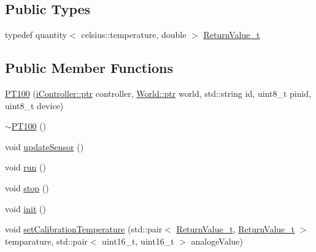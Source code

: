 \subsection*{Public Types}
\begin{DoxyCompactItemize}
\item 
typedef quantity$<$ celsius\+::temperature, double $>$ \hyperlink{classo_cpt_1_1components_1_1sensors_1_1_p_t100_a46c281d97bd4bd34e16f486a6aeda82e}{Return\+Value\+\_\+t}
\end{DoxyCompactItemize}
\subsection*{Public Member Functions}
\begin{DoxyCompactItemize}
\item 
\hyperlink{classo_cpt_1_1components_1_1sensors_1_1_p_t100_aedb71224bcffefd6d43ee72458344826}{P\+T100} (\hyperlink{classo_cpt_1_1i_controller_a6d89a95cd6ad68bb74adfaca2f36370f}{i\+Controller\+::ptr} controller, \hyperlink{classo_cpt_1_1_world_aa6e591e3096d5de71e0cec9039663d67}{World\+::ptr} world, std\+::string id, uint8\+\_\+t pinid, uint8\+\_\+t device)
\item 
\hyperlink{classo_cpt_1_1components_1_1sensors_1_1_p_t100_aa6fcce0276d47e75a16f153962c57b8c}{$\sim$\+P\+T100} ()
\item 
void \hyperlink{classo_cpt_1_1components_1_1sensors_1_1_p_t100_a66619675288a5344a55242d9bf097aee}{update\+Sensor} ()
\item 
void \hyperlink{classo_cpt_1_1components_1_1sensors_1_1_p_t100_a41dfc55a4be7993949feeb5ac013690d}{run} ()
\item 
void \hyperlink{classo_cpt_1_1components_1_1sensors_1_1_p_t100_a6d80e18a58cf4e1b9b6ce82b441209e2}{stop} ()
\item 
void \hyperlink{classo_cpt_1_1components_1_1sensors_1_1_p_t100_a296d0c3c2a55df465e127462c8c30215}{init} ()
\item 
void \hyperlink{classo_cpt_1_1components_1_1sensors_1_1_p_t100_aa809a235b76c237c3a1f66cf9dd7e381}{set\+Calibration\+Temperature} (std\+::pair$<$ \hyperlink{classo_cpt_1_1components_1_1sensors_1_1_p_t100_a46c281d97bd4bd34e16f486a6aeda82e}{Return\+Value\+\_\+t}, \hyperlink{classo_cpt_1_1components_1_1sensors_1_1_p_t100_a46c281d97bd4bd34e16f486a6aeda82e}{Return\+Value\+\_\+t} $>$ temparature, std\+::pair$<$ uint16\+\_\+t, uint16\+\_\+t $>$ analoge\+Value)
\end{DoxyCompactItemize}
